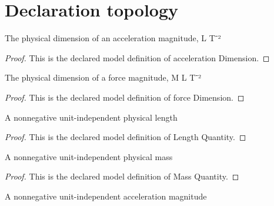 \section{Declaration topology}
\begin{definition}
  \label{def:physics:phyx-mini-0720:phyxminiproblems-problemphyxmini0720-accelerationdimension}
  The physical dimension of an acceleration magnitude, L T⁻²
\end{definition}
\begin{proof}
  This is the declared model definition of acceleration Dimension.
\end{proof}
\begin{definition}
  \label{def:physics:phyx-mini-0720:phyxminiproblems-problemphyxmini0720-forcedimension}
  The physical dimension of a force magnitude, M L T⁻²
\end{definition}
\begin{proof}
  This is the declared model definition of force Dimension.
\end{proof}
\begin{definition}
  \label{def:physics:phyx-mini-0720:phyxminiproblems-problemphyxmini0720-lengthquantity}
  A nonnegative unit-independent physical length
\end{definition}
\begin{proof}
  This is the declared model definition of Length Quantity.
\end{proof}
\begin{definition}
  \label{def:physics:phyx-mini-0720:phyxminiproblems-problemphyxmini0720-massquantity}
  A nonnegative unit-independent physical mass
\end{definition}
\begin{proof}
  This is the declared model definition of Mass Quantity.
\end{proof}
\begin{definition}
  \label{def:physics:phyx-mini-0720:phyxminiproblems-problemphyxmini0720-accelerationquantity}
  A nonnegative unit-independent acceleration magnitude
\end{definition}

